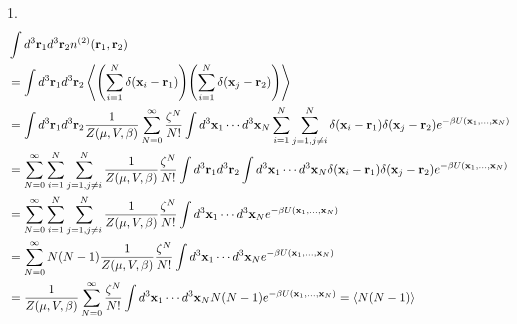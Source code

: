 \documentclass{article}
\begin{document}
1.
\begin{align}
\begin{split}
&\int d^3\vb{r}_1d^3\vb{r}_2n^{(2)}(\vb{r}_1,\vb{r}_2)\\
&=\int d^3\vb{r}_1d^3\vb{r}_2\ev{\qty(\sum_{i=1}^N\delta(\vb{x}_i-\vb{r}_1))\qty(\sum_{i=1}^N\delta(\vb{x}_j-\vb{r}_2))}\\
&=\int d^3\vb{r}_1d^3\vb{r}_2\frac{1}{Z(\mu,V,\beta)}\sum_{N=0}^\infty\frac{\zeta^N}{N!}\int d^3\vb{x}_1\cdots d^3\vb{x}_N\sum_{i=1}^N\sum_{j=1,j\neq i}^N\delta(\vb{x}_i-\vb{r}_1)\delta(\vb{x}_j-\vb{r}_2) e^{-\beta U(\vb{x}_1,\dots,\vb{x}_N)}\\
&=\sum_{N=0}^\infty\sum_{i=1}^N\sum_{j=1,j\neq i}^N\frac{1}{Z(\mu,V,\beta)}\frac{\zeta^N}{N!}\int d^3\vb{r}_1d^3\vb{r}_2\int d^3\vb{x}_1\cdots d^3\vb{x}_N\delta(\vb{x}_i-\vb{r}_1)\delta(\vb{x}_j-\vb{r}_2) e^{-\beta U(\vb{x}_1,\dots,\vb{x}_N)}\\
&=\sum_{N=0}^\infty\sum_{i=1}^N\sum_{j=1,j\neq i}^N\frac{1}{Z(\mu,V,\beta)}\frac{\zeta^N}{N!}\int d^3\vb{x}_1\cdots d^3\vb{x}_N e^{-\beta U(\vb{x}_1,\dots,\vb{x}_N)}\\
&=\sum_{N=0}^\infty N(N-1)\frac{1}{Z(\mu,V,\beta)}\frac{\zeta^N}{N!}\int d^3\vb{x}_1\cdots d^3\vb{x}_N e^{-\beta U(\vb{x}_1,\dots,\vb{x}_N)}\\
&= \frac{1}{Z(\mu,V,\beta)}\sum_{N=0}^\infty\frac{\zeta^N}{N!}\int d^3\vb{x}_1\cdots d^3\vb{x}_N N(N-1)e^{-\beta U(\vb{x}_1,\dots,\vb{x}_N)}=\ev{N(N-1)}\\
\end{split}
\end{align}
\end{document}
